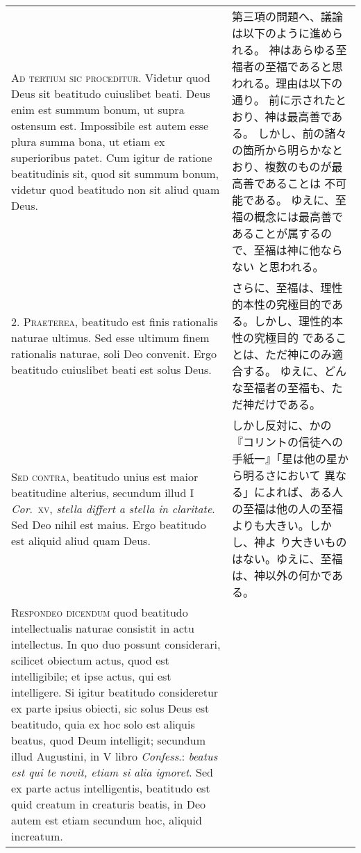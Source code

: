 \documentclass[10pt]{jsarticle} %
\begin{document}
\begin{longtable}{p{21em}p{21em}}


{\Huge A}{\scshape d tertium sic proceditur}. Videtur quod Deus sit beatitudo cuiuslibet
beati. Deus enim est summum bonum, ut supra ostensum est. Impossibile
est autem esse plura summa bona, ut etiam ex superioribus patet. Cum
igitur de ratione beatitudinis sit, quod sit summum bonum, videtur quod
beatitudo non sit aliud quam Deus.


&

第三項の問題へ、議論は以下のように進められる。
神はあらゆる至福者の至福であると思われる。理由は以下の通り。
前に示されたとおり、神は最高善である。
しかし、前の諸々の箇所から明らかなとおり、複数のものが最高善であることは
 不可能である。
ゆえに、至福の概念には最高善であることが属するので、至福は神に他ならない
 と思われる。



\\



2. {\scshape Praeterea}, beatitudo est finis rationalis naturae ultimus. Sed esse
ultimum finem rationalis naturae, soli Deo convenit. Ergo beatitudo
cuiuslibet beati est solus Deus.


&

さらに、至福は、理性的本性の究極目的である。しかし、理性的本性の究極目的
 であることは、ただ神にのみ適合する。
ゆえに、どんな至福者の至福も、ただ神だけである。


\\



{\scshape Sed contra}, beatitudo unius est maior beatitudine alterius, secundum
illud I {\itshape Cor}.~{\scshape xv}, {\itshape stella differt a stella in claritate}. Sed Deo nihil est
maius. Ergo beatitudo est aliquid aliud quam Deus.


&

しかし反対に、かの『コリントの信徒への手紙一』「星は他の星から明るさにおいて
 異なる」によれば、ある人の至福は他の人の至福よりも大きい。しかし、神よ
 り大きいものはない。ゆえに、至福は、神以外の何かである。


\\



{\scshape Respondeo dicendum} quod beatitudo intellectualis naturae consistit in
actu intellectus. In quo duo possunt considerari, scilicet obiectum
actus, quod est intelligibile; et ipse actus, qui est intelligere. Si
igitur beatitudo consideretur ex parte ipsius obiecti, sic solus Deus
est beatitudo, quia ex hoc solo est aliquis beatus, quod Deum
intelligit; secundum illud Augustini, in V libro {\itshape Confess}.: {\itshape beatus est
qui te novit, etiam si alia ignoret}. Sed ex parte actus intelligentis,
beatitudo est quid creatum in creaturis beatis, in Deo autem est etiam
secundum hoc, aliquid increatum.



\end{longtable}
\end{document}
